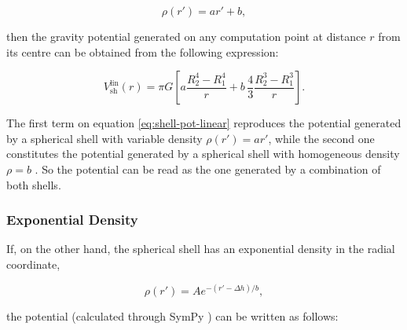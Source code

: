 \documentclass[extra]{gji}
\begin{document}
\begin{equation}
    \rho(r') = ar' + b,
\end{equation}

\noindent then the gravity potential generated on any computation point at distance $r$ from its centre can be obtained from the following expression:

\begin{equation}
    V_\text{sh}^\text{lin}(r) = \pi G \left[ 
    a \frac{R_2^4 - R_1^4}{r} +
    b \,\frac{4}{3} \frac{R_2^3 - R_1^3}{r} \right].
    \label{eq:shell-pot-linear}
\end{equation}

The first term on equation \ref{eq:shell-pot-linear} reproduces the potential generated by a spherical shell with variable density $\rho(r') = ar'$, while the second one constitutes the potential generated by a spherical shell with homogeneous density $\rho = b$ \citep{Mikuska2006,Grombein2013}.
So the potential can be read as the one generated by a combination of both shells.


\subsubsection{Exponential Density}

If, on the other hand, the spherical shell has an exponential density in the radial coordinate,

\begin{equation}
    \rho(r') = Ae^{-(r' - \Delta h)/b},
\end{equation}

\noindent the potential (calculated through SymPy \citep{sympy2017}) can be written as follows:

\end{document}

